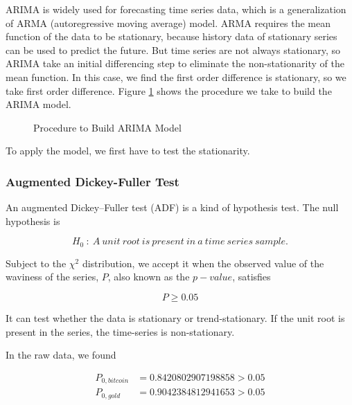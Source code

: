 \documentclass[12pt,a4paper]{article}
\newcommand{\Predictor}{ARIMA }
\begin{document}
\begin{spacing}{1.2}
\Predictor is widely used for forecasting time series data, which is a generalization of ARMA (autoregressive moving average) model. ARMA requires the mean function of the data to be stationary, because history data of stationary series can be used to predict the future. But time series are not always stationary, so ARIMA take an initial differencing step to eliminate the non-stationarity of the mean function. In this case, we find the first order difference is stationary, so we take first order difference. Figure \ref{figure:flow_chart} shows the procedure we take to build the \Predictor model.

 \begin{figure}[H]
 	\caption{Procedure to Build ARIMA Model}
 	\label{figure:flow_chart}
 \end{figure}


To apply the model, we first have to test the stationarity.

\subsubsection{Augmented Dickey-Fuller Test}

An augmented Dickey–Fuller test (ADF) is a kind of hypothesis test. The null hypothesis is 

$$
H_0 \ : \ A \ unit \ root \ is \ present \ in \ a \ time \ series \ sample.
$$

Subject to the $\chi^2$ distribution, we accept it when the observed value of the waviness of the series, $P$, also known as the $p-value$, satisfies

$$
P \ge 0.05
$$

It can test whether the data is stationary or trend-stationary. If the unit root is present in the series, the time-series is non-stationary.

In the raw data, we found

\begin{align*}
	P_{0,bitcoin} &=0.8420802907198858 > 0.05 \\
	P_{0,gold} &=0.9042384812941653 > 0.05 
\end{align*}



\end{spacing}
\end{document}
